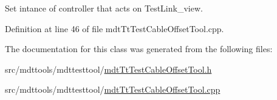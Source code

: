 Set intance of controller that acts on Test\-Link\-\_\-view. 



Definition at line 46 of file mdt\-Tt\-Test\-Cable\-Offset\-Tool.\-cpp.



The documentation for this class was generated from the following files\-:\begin{DoxyCompactItemize}
\item 
src/mdttools/mdttesttool/\hyperlink{mdt_tt_test_cable_offset_tool_8h}{mdt\-Tt\-Test\-Cable\-Offset\-Tool.\-h}\item 
src/mdttools/mdttesttool/\hyperlink{mdt_tt_test_cable_offset_tool_8cpp}{mdt\-Tt\-Test\-Cable\-Offset\-Tool.\-cpp}\end{DoxyCompactItemize}
